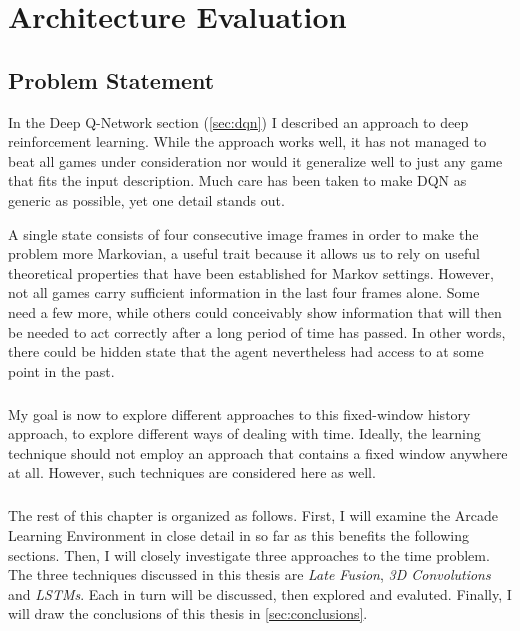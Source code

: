 \chapter{Architecture Evaluation}
\label{chap:experiments}

\section{Problem Statement}
\label{sec:problem_statement}

In the Deep Q-Network section (\ref{sec:dqn})
I described an approach to deep reinforcement learning.
While the approach works well,
it has not managed to beat all games under consideration
nor would it generalize well to just any game
that fits the input description.
Much care has been taken to make DQN as generic as possible,
yet one detail stands out.

A single state consists of four consecutive image frames
in order to make the problem more Markovian,
a useful trait because it allows us to rely on
useful theoretical properties that have been established
for Markov settings.
However, not all games carry sufficient information
in the last four frames alone.
Some need a few more,
while others could conceivably
show information
that will then be needed to act correctly
after a long period of time has passed.
In other words, there could be hidden state
that the agent nevertheless had access to
at some point in the past.

\paragraph{}
My goal is now to explore different approaches
to this fixed-window history approach,
to explore different ways of dealing with time.
Ideally,
the learning technique should not employ an approach
that contains a fixed window anywhere at all.
However, such techniques are considered here as well.

\paragraph{}
The rest of this chapter is organized as follows.
First, I will examine the Arcade Learning Environment
in close detail in so far as this benefits
the following sections.
Then, I will closely investigate three approaches
to the time problem.
The three techniques discussed in this thesis are
\textit{Late Fusion},
\textit{3D Convolutions}
and \textit{LSTMs}.
Each in turn will be discussed,
then explored and evaluted.
Finally,
I will draw the conclusions of this thesis
in \ref{sec:conclusions}.

